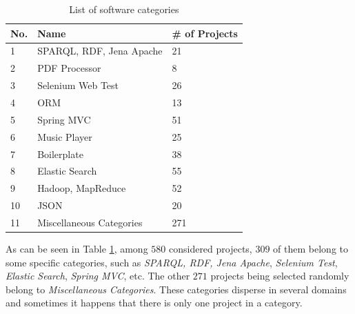 \begin{table}[h!]
	\small
	\centering
	\begin{tabular}{|p{0.80cm}|p{5.00cm}|p{2.30cm}|}  \hline
		{\bf No.} & {\bf Name} & {\bf \# of Projects} \\  \hline
		1 & SPARQL, RDF, Jena Apache & 21 \\  \hline
		2 & PDF Processor & 8  \\  \hline
		3 & Selenium Web Test & 26  \\  \hline
		4 & ORM & 13  \\  \hline
		5 & Spring MVC & 51  \\  \hline
		6 & Music Player & 25  \\  \hline
		7 & Boilerplate & 38  \\  \hline
		8 & Elastic Search & 55  \\  \hline
		9 & Hadoop, MapReduce & 52  \\  \hline
		10 & JSON & 20  \\  \hline
		11 & Miscellaneous Categories & 271  \\  \hline
	\end{tabular}
	\caption[List of software categories]{List of software categories}
	\label{tab:Categories}
\end{table}

As can be seen in Table \ref{tab:Categories}, among $580$ considered projects, $309$ of them belong to some specific categories, such as \emph{SPARQL, RDF, Jena Apache}, \emph{Selenium Test}, \emph{Elastic Search}, \emph{Spring MVC}, etc. The other $271$ projects being selected randomly belong to \emph{Miscellaneous Categories}. These categories disperse in several domains and sometimes it happens that there is only one project in a category. %




